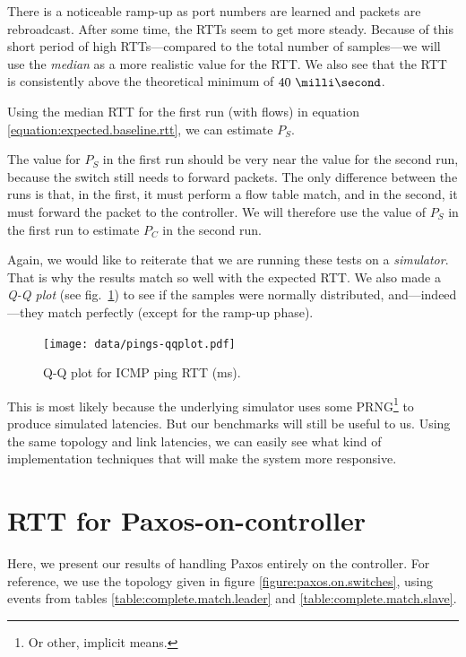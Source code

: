 

There is a noticeable ramp-up as port numbers are learned and packets are
rebroadcast.  After some time, the \acs{RTT}s seem to get more steady.
Because of this short period of high \acs{RTT}s---compared to the total number of
samples---we will use the \textit{median} as a more realistic value for the
RTT. We also see that the RTT is consistently above the theoretical minimum
of $\ms{40}$.

Using the median RTT for the first run (with flows)
in equation \ref{equation:expected.baseline.rtt}, we can estimate $P_S$.



The value for $P_S$ in the first run should be very near the value for the
second run, because the switch still needs to forward packets.  The only
difference between the runs is that, in the first, it must perform a flow
table match, and in the second, it must forward the packet to the
controller.  We will therefore use the value of $P_S$ in the first run to
estimate $P_C$ in the second run.



Again, we would like to reiterate that we are running these tests on a
\textit{simulator}.  That is why the results match so well with the expected
\acs{RTT}.  We also made a \textit{Q-Q plot} (see
fig.~\ref{figure:pings.qqplot}) to see if the samples were normally
distributed, and---indeed---they match perfectly (except for the ramp-up
phase).

\begin{figure}[H]
  \centering
  \texttt{[image: data/pings-qqplot.pdf]}
  \caption{Q-Q plot for ICMP ping RTT (ms).}
  \label{figure:pings.qqplot}
\end{figure}

This is most likely because the underlying simulator uses some
\acf{PRNG}\footnote{Or other, implicit means.} to produce simulated latencies.  But our
benchmarks will still be useful to us.  Using the same topology and link
latencies, we can easily see what kind of implementation techniques that
will make the system more responsive.


\section{RTT for Paxos-on-controller}

Here, we present our results of handling Paxos entirely on the controller.
For reference, we use the topology given in figure
\vref{figure:paxos.on.switches}, using events from tables
\vref{table:complete.match.leader} and \vref{table:complete.match.slave}.

